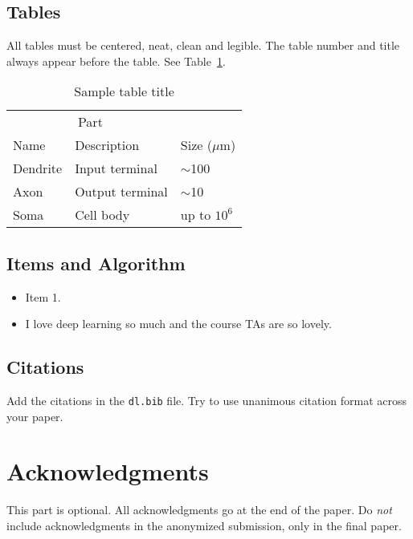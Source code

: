 \documentclass{article}
\begin{document}
\subsection{Tables}

All tables must be centered, neat, clean and legible.  The table
number and title always appear before the table.  See
Table~\ref{sample-table}.

\begin{table}[t]
  \caption{Sample table title}
  \label{sample-table}
  \centering
  \begin{tabular}{lll}
    \toprule
    \multicolumn{2}{c}{Part}                   \\
    \cmidrule{1-2}
    Name     & Description     & Size ($\mu$m) \\
    \midrule
    Dendrite & Input terminal  & $\sim$100     \\
    Axon     & Output terminal & $\sim$10      \\
    Soma     & Cell body       & up to $10^6$  \\
    \bottomrule
  \end{tabular}
\end{table}

\subsection{Items and Algorithm}

\begin{itemize}

\item Item 1.

\item I love deep learning so much and the course TAs are so lovely.

\end{itemize}

\subsection{Citations}

Add the citations in the \texttt{dl.bib} file.
Try to use unanimous citation format across your paper.

\section*{Acknowledgments}

This part is optional.
All acknowledgments go at the end of the paper.
Do \textit{not} include acknowledgments in the anonymized submission, only in the final paper.
\end{document}
